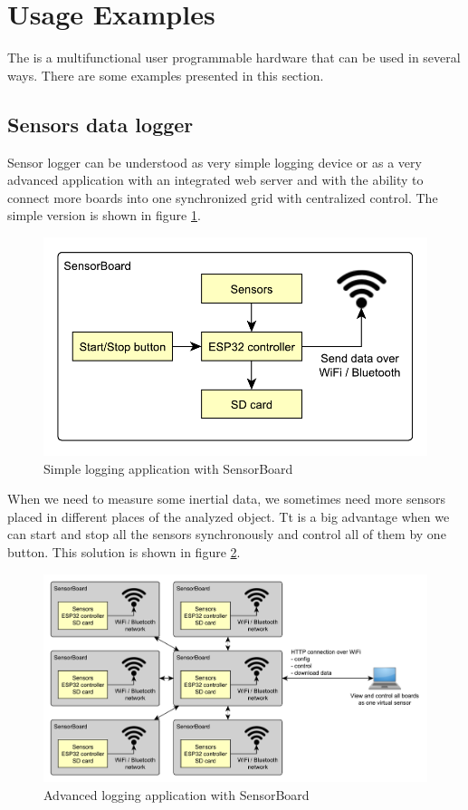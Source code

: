 \section{Usage Examples}
The  is a multifunctional user programmable hardware that can be used in several ways. There are some examples presented in this section.

\subsection{Sensors data logger}
\label{ExampleLogger}
Sensor logger can be understood as very simple logging device or as a very advanced application with an integrated web server and with the ability to connect more boards into one synchronized grid with centralized control. The simple version is shown in figure \ref{UELogging1}.

\begin{figure}
    \centering
    \caption{Simple logging application with SensorBoard}
    \label{UELogging1}
    \includegraphics[scale=1]{img/UsageExamplesLogger1.pdf}
\end{figure}

When we need to measure some inertial data, we sometimes need more sensors placed in different places of the analyzed object. Tt is a big advantage when we can start and stop all the sensors synchronously and control all of them by one button. This solution is shown in figure \ref{UELogging2}.

\begin{figure}
    \centering
    \caption{Advanced logging application with SensorBoard}
    \label{UELogging2}
    \includegraphics[width=\linewidth]{img/UsageExamplesLogger2.pdf}
\end{figure}


